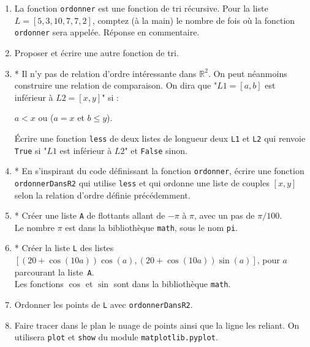 \begin{enumerate}
\item La fonction \texttt{ordonner} est une fonction de tri récursive. Pour la liste $L=[5,3,10,7,7,2]$, comptez (à la main) le nombre de fois où la fonction \texttt{ordonner} sera appelée. Réponse en commentaire.
\item Proposer et écrire une autre fonction de tri.
\item * Il n'y pas de relation d'ordre intéressante dans $\mathbb{R}^2$. On peut néanmoins construire une relation de comparaison. On dira que "$L1=[a,b]$ est inférieur à $L2=[x,y]$" si  :
\begin{center}
$a<x$ \quad ou \quad ($a=x$ et $b\leqslant y$).
\end{center}
\'Ecrire une fonction \texttt{less} de deux listes de longueur deux \texttt{L1} et \texttt{L2} qui renvoie \texttt{True} si "$L1$ est inférieur à $L2$" et \texttt{False} sinon.
\item * En s'inspirant du code définissant la fonction \texttt{ordonner}, écrire une fonction \texttt{ordonnerDansR2} qui utilise \texttt{less} et qui ordonne une liste de couples $[x,y]$ selon la relation d'ordre définie précédemment.
\item * Créer une liste \texttt{A} de flottants allant de $-\pi$ à $\pi$, avec un pas de  $\pi/100$.\\
Le nombre $\pi$ est dans la bibliothèque \texttt{math}, sous le nom \texttt{pi}.
\item * Créer la liste \texttt{L} des listes $[(20+\cos(10a))\cos(a),(20+\cos(10a))\sin(a)]$, pour $a$ parcourant la liste~\texttt{A}.\\
Les fonctions $\cos$ et $\sin$ sont dans la bibliothèque \texttt{math}.
\item Ordonner les points de \texttt{L} avec \texttt{ordonnerDansR2}. 
\item Faire tracer dans le plan le nuage de points ainsi que la ligne les reliant. On utilisera \texttt{plot} et \texttt{show} du module \texttt{matplotlib.pyplot}.%
\end{enumerate}




